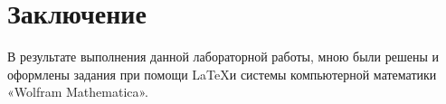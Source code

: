 \section{Заключение}
В результате выполнения данной лабораторной работы, мною были решены и оформлены задания при помощи \LaTeX и системы компьютерной математики «Wolfram Mathematica».